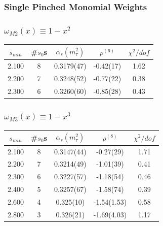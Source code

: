\documentclass{beamer}
\begin{document}
\subsubsection{Single Pinched Monomial Weights}
\begin{frame}
  \frametitle{\(\omega_{M2}(x) \equiv 1-x^2\)}
  \centering
  \begin{tabular}{ccccc}
    \toprule
    \(s_{min}\) & \#\(s_0\)s & \(\alpha_s(m_\tau^2)\) & \(\rho^{(6)}\) &  \(\chi^2/dof\)  \\
    \midrule
    2.100 & 8 & 0.3179(47) & -0.42(17) & 1.62 \\
    \rowcolor{primary}
    2.200 & 7 & 0.3248(52) & -0.77(22) & 0.38 \\
    2.300 & 6 & 0.3260(60) & -0.85(28) & 0.43 \\
    \bottomrule
  \end{tabular}
\end{frame}
\begin{frame}
  \frametitle{\(\omega_{M3}(x) \equiv 1-x^3\)}
  \centering
  \begin{tabular}{ccccc}
    \toprule
    \(s_{min}\) & \#\(s_0\)s & \(\alpha_s(m_\tau^2)\) & \(\rho^{(8)}\) &  \(\chi^2/dof\)  \\
    \midrule
    2.100 & 8 & 0.3147(44) & -0.27(29) & 1.71 \\
    \rowcolor{primary}
    2.200 & 7  & 0.3214(49) & -1.01(39) & 0.41 \\
    2.300 & 6  & 0.3227(57) & -1.18(54) & 0.46 \\
    2.400 & 5  & 0.3257(67) & -1.58(74) & 0.39 \\
    2.600 & 4  & 0.325(10) & -1.54(1.53) & 0.58 \\
    2.800 & 3  & 0.326(21) & -1.69(4.03) & 1.17 \\
    \bottomrule
  \end{tabular}
\end{frame}
\end{document}
